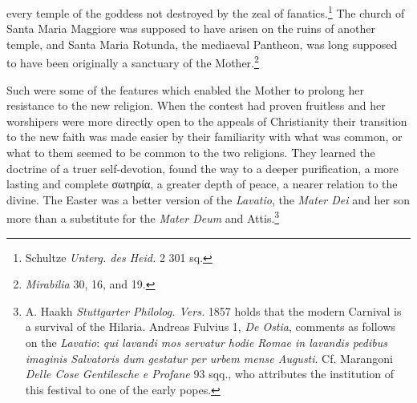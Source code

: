 \documentclass[a4paper, 11pt, oneside, polutonikogreek, french]{article}
\begin{document}
every temple of the goddess not destroyed by the zeal of fanatics.\footnote{Schultze \emph{Unterg. des Heid.} 2 301 sq.} The church of Santa Maria Maggiore was supposed to have arisen on the ruins of another temple, and Santa Maria Rotunda, the mediaeval Pantheon, was long supposed to have been originally a sanctuary of the Mother.\footnote{\emph{Mirabilia} 30, 16, and 19.}

Such were some of the features which enabled the Mother to prolong her resistance to the new religion. When the contest had proven fruitless and her worshipers were more directly open to the appeals of Christianity their transition to the new faith was made easier by their familiarity with what was common, or what to them seemed to be common to the two religions. They learned the doctrine of a truer self-devotion, found the way to a deeper purification, a more lasting and complete σωτηρία, a greater depth of peace, a nearer relation to the divine. The Easter was a better version of the \emph{Lavatio}, the \emph{Mater Dei} and her son more than a substitute for the \emph{Mater Deum} and Attis.\footnote{A. Haakh \emph{Stuttgarter Philolog. Vers.} 1857 holds that the modern Carnival is a survival of the Hilaria. Andreas Fulvius 1, \emph{De Ostia}, comments as follows on the \emph{Lavatio}: \emph{qui lavandi mos servatur hodie Romae in lavandis pedibus imaginis Salvatoris dum gestatur per urbem mense Augusti}. Cf. Marangoni \emph{Delle Cose Gentilesche e Profane} 93 sqq., who attributes the institution of this festival to one of the early popes.}
\clearpage
\end{document}
